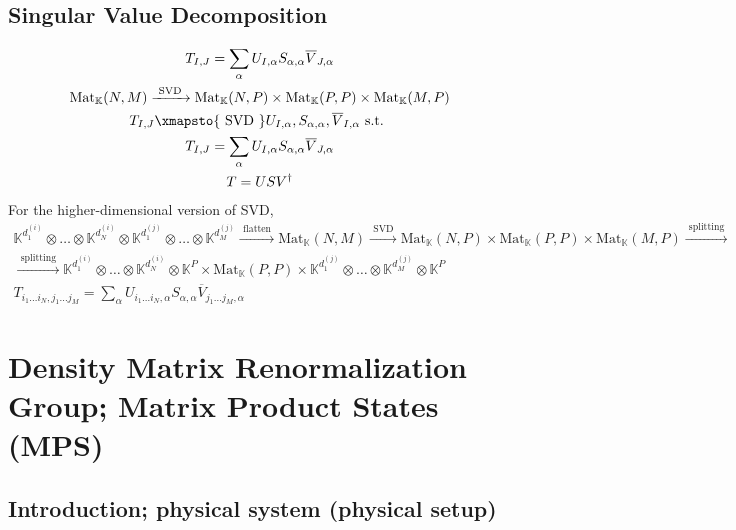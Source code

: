 \subsection{Singular Value Decomposition}  

\begin{equation}
\begin{gathered}
	T_{I,J} = \sum_{\alpha} U_{I,\alpha} S_{\alpha,\alpha} \overline{V}_{J,\alpha} \\ 
 \text{Mat}_{\mathbb{K}}(N,M) \xrightarrow{ \text{ SVD } } \text{Mat}_{\mathbb{K}}(N,P) \times \text{Mat}_{\mathbb{K}}(P,P) \times \text{Mat}_{\mathbb{K}}(M,P)    \\
	T_{I,J} \xmapsto{ \text{ SVD } } U_{I,\alpha}, S_{\alpha,\alpha} , \overline{V}_{I,\alpha} \text{ s.t. } \\
T_{I,J} = \sum_{\alpha} U_{I,\alpha} S_{\alpha, \alpha} \overline{V}_{J,\alpha}    \\
T=USV^{\dag}
\end{gathered}
\end{equation}
For the higher-dimensional version of SVD, 
\begin{equation}
\begin{gathered}
	\mathbb{K}^{d_1^{(i)} } \otimes \dots \otimes \mathbb{K}^{d^{(i)}_N} \otimes \mathbb{K}^{d_1^{(j)} }\otimes \dots \otimes \mathbb{K}^{d_M^{(j)} }  \xrightarrow{ \text{ flatten } } \text{Mat}_{\mathbb{K}}(N,M) \xrightarrow{ \text{ SVD } }     \text{Mat}_{\mathbb{K}}(N,P) \times \text{Mat}_{\mathbb{K}}(P,P) \times \text{Mat}_{\mathbb{K}}(M,P) \xrightarrow{ \text{ splitting } } \\ 
\xrightarrow{ \text{ splitting } } \mathbb{K}^{d_1^{(i)} } \otimes \dots \otimes \mathbb{K}^{d^{(i)}_N} \otimes \mathbb{K}^P \times \text{Mat}_{\mathbb{K}}(P,P) \times  \mathbb{K}^{d_1^{(j)} }\otimes \dots \otimes \mathbb{K}^{d_M^{(j)} } \otimes \mathbb{K}^P  \\
T_{i_1\dots i_N,j_1 \dots j_M} = \sum_{\alpha} U_{i_1\dots i_N,\alpha} S_{\alpha,\alpha} \overline{V}_{j_1 \dots j_M, \alpha}
\end{gathered}
\end{equation}

\section{Density Matrix Renormalization Group; Matrix Product States (MPS)}

\subsection{Introduction; physical system (physical setup)}

